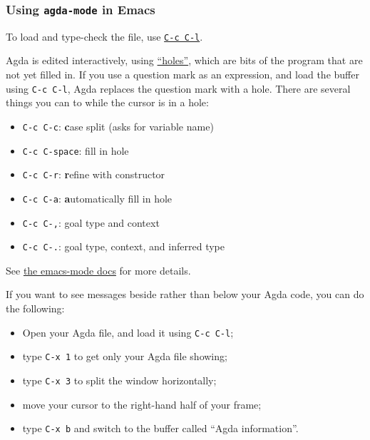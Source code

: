 \hypertarget{using-agda-mode-in-emacs}{%
\subsubsection{\texorpdfstring{Using \texttt{agda-mode} in
Emacs}{Using agda-mode in Emacs}}\label{using-agda-mode-in-emacs}}

To load and type-check the file, use
\href{https://agda.readthedocs.io/en/v2.6.1.3/tools/emacs-mode.html\#notation-for-key-combinations}{\texttt{C-c\ C-l}}.

Agda is edited interactively, using
\href{https://agda.readthedocs.io/en/v2.6.1.3/getting-started/quick-guide.html}{``holes''},
which are bits of the program that are not yet filled in. If you use a
question mark as an expression, and load the buffer using
\texttt{C-c\ C-l}, Agda replaces the question mark with a hole. There
are several things you can to while the cursor is in a hole:

\begin{itemize}
\tightlist
\item
  \texttt{C-c\ C-c}: \textbf{c}ase split (asks for variable name)
\item
  \texttt{C-c\ C-space}: fill in hole
\item
  \texttt{C-c\ C-r}: \textbf{r}efine with constructor
\item
  \texttt{C-c\ C-a}: \textbf{a}utomatically fill in hole
\item
  \texttt{C-c\ C-,}: goal type and context
\item
  \texttt{C-c\ C-.}: goal type, context, and inferred type
\end{itemize}

See
\href{https://agda.readthedocs.io/en/v2.6.1.3/tools/emacs-mode.html}{the
emacs-mode docs} for more details.

If you want to see messages beside rather than below your Agda code, you
can do the following:

\begin{itemize}
\tightlist
\item
  Open your Agda file, and load it using \texttt{C-c\ C-l};
\item
  type \texttt{C-x\ 1} to get only your Agda file showing;
\item
  type \texttt{C-x\ 3} to split the window horizontally;
\item
  move your cursor to the right-hand half of your frame;
\item
  type \texttt{C-x\ b} and switch to the buffer called ``Agda
  information''.
\end{itemize}

